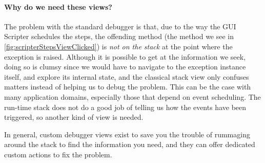 \documentclass[sigplan,screen]{acmart} %
\newcommand\on[1]{\nbc{ON}{#1}{olive}} %
\begin{document}

\paragraph{Why do we need these views?}
The problem with the standard debugger is that, due to the way the GUI Scripter schedules the steps, the offending method (\ie the  method we see in \autoref{fig:scripterStepsViewClicked}) is \emph{not on the stack} at the point where the exception is raised.
Although it is possible to get at the information we seek, doing so is clumsy since we would have to navigate to the exception instance itself, and explore its  internal state, and the classical stack view only confuses matters instead of helping us to debug the problem.
This can be the case with many application domains, especially those that depend on event scheduling.
The run-time stack does not do a good job of telling us how the events have been triggered, so another kind of view is needed.

In general, custom debugger views exist to save you the trouble of rummaging around the stack to find the information you need, and they can offer dedicated custom actions to fix the problem.

\end{document}
